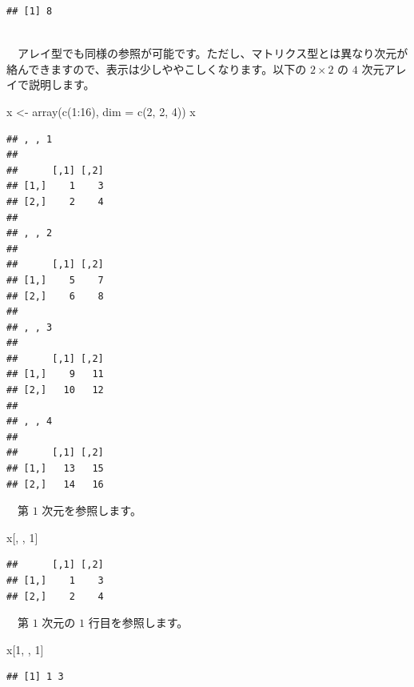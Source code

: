 \documentclass[
  12pt,
]{book}
\newenvironment{Shaded}{\begin{snugshade}}{\end{snugshade}}
\newcommand{\AttributeTok}[1]{\textcolor[rgb]{0.77,0.63,0.00}{#1}}
\newcommand{\DecValTok}[1]{\textcolor[rgb]{0.00,0.00,0.81}{#1}}
\newcommand{\FunctionTok}[1]{\textcolor[rgb]{0.00,0.00,0.00}{#1}}
\newcommand{\NormalTok}[1]{#1}
\newcommand{\OtherTok}[1]{\textcolor[rgb]{0.56,0.35,0.01}{#1}}
\newcommand{\SpecialCharTok}[1]{\textcolor[rgb]{0.00,0.00,0.00}{#1}}
\begin{document}
\begin{verbatim}
## [1] 8
\end{verbatim}

　\\
　アレイ型でも同様の参照が可能です。ただし、マトリクス型とは異なり次元が絡んできますので、表示は少しややこしくなります。以下の \(2 \times 2\) の \(4\) 次元アレイで説明します。

\begin{Shaded}
\begin{Highlighting}[numbers=left,,]
\NormalTok{x }\OtherTok{\textless{}{-}} \FunctionTok{array}\NormalTok{(}\FunctionTok{c}\NormalTok{(}\DecValTok{1}\SpecialCharTok{:}\DecValTok{16}\NormalTok{), }\AttributeTok{dim =} \FunctionTok{c}\NormalTok{(}\DecValTok{2}\NormalTok{, }\DecValTok{2}\NormalTok{, }\DecValTok{4}\NormalTok{))}
\NormalTok{x}
\end{Highlighting}
\end{Shaded}

\begin{verbatim}
## , , 1
## 
##      [,1] [,2]
## [1,]    1    3
## [2,]    2    4
## 
## , , 2
## 
##      [,1] [,2]
## [1,]    5    7
## [2,]    6    8
## 
## , , 3
## 
##      [,1] [,2]
## [1,]    9   11
## [2,]   10   12
## 
## , , 4
## 
##      [,1] [,2]
## [1,]   13   15
## [2,]   14   16
\end{verbatim}

　第 \(1\) 次元を参照します。

\begin{Shaded}
\begin{Highlighting}[numbers=left,,]
\NormalTok{x[, , }\DecValTok{1}\NormalTok{]}
\end{Highlighting}
\end{Shaded}

\begin{verbatim}
##      [,1] [,2]
## [1,]    1    3
## [2,]    2    4
\end{verbatim}

　第 \(1\) 次元の \(1\) 行目を参照します。

\begin{Shaded}
\begin{Highlighting}[numbers=left,,]
\NormalTok{x[}\DecValTok{1}\NormalTok{, , }\DecValTok{1}\NormalTok{]}
\end{Highlighting}
\end{Shaded}

\begin{verbatim}
## [1] 1 3
\end{verbatim}
\end{document}
